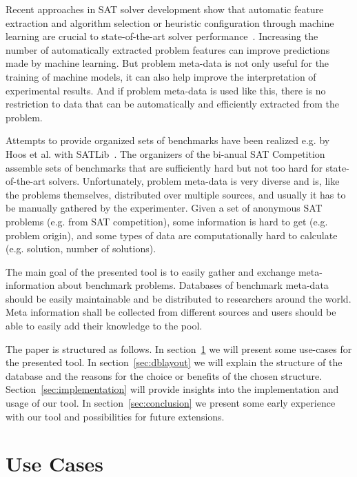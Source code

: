 \documentclass{easychair}
\begin{document}
Recent approaches in SAT solver development show that automatic feature extraction and algorithm selection or heuristic configuration through machine learning are crucial to state-of-the-art solver performance~\cite{Hoos:2016:Aslib,Balyo:2016:SATRace}. Increasing the number of automatically extracted problem features can improve predictions made by machine learning. But problem meta-data is not only useful for the training of machine models, it can also help improve the interpretation of experimental results. And if problem meta-data is used like this, there is no restriction to data that can be automatically and efficiently extracted from the problem.

Attempts to provide organized sets of benchmarks have been realized e.g. by Hoos et al. with SATLib~\cite{Hoos:2000:SatLib,SatLibWeb}. The organizers of the bi-anual SAT Competition~\cite{SatCompWeb} assemble sets of benchmarks that are sufficiently hard but not too hard for state-of-the-art solvers. Unfortunately, problem meta-data is very diverse and is, like the problems themselves, distributed over multiple sources, and usually it has to be manually gathered by the experimenter. Given a set of anonymous SAT problems (e.g. from SAT competition), some information is hard to get (e.g. problem origin), and some types of data are computationally hard to calculate (e.g. solution, number of solutions). 

The main goal of the presented tool is to easily gather and exchange meta-information about benchmark problems. Databases of benchmark meta-data should be easily maintainable and be distributed to researchers around the world. Meta information shall be collected from different sources and users should be able to easily add their knowledge to the pool. 

The paper is structured as follows. In section~\ref{sec:usecases} we will present some use-cases for the presented tool. In section~\ref{sec:dblayout} we will explain the structure of the database and the reasons for the choice or benefits of the chosen structure. Section~\ref{sec:implementation} will provide insights into the implementation and usage of our tool. In section~\ref{sec:conclusion} we present some early experience with our tool and possibilities for future extensions. 

\section{Use Cases}
\label{sec:usecases}
\end{document}

